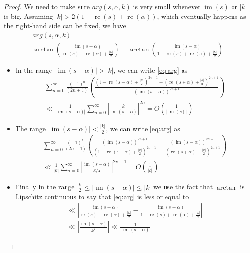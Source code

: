 \documentclass[a4paper,11pt]{amsart}
\theoremstyle{definition}
\newcommand{\imag}{\operatorname{im}}
\newcommand{\real}{\operatorname{re}}
\begin{document}
\begin{proof}
    We need to make sure $arg(s,\alpha,k)$ is very small whenever $\imag(s)$ or $\vert{k}\vert$ is big. Assuming $\vert{k}\vert > 2(1-\real(s)+\real(\alpha))$, which eventually happens as the right-hand side can be fixed, we have \begin{align}\label{eq:arg}&arg(s,\alpha,k) =\nonumber\\& \arctan\left(\frac{\imag(s-\alpha)}{\real(s)+\real(\alpha)+\frac{\vert{k}\vert}{2}}\right)-\arctan\left(\frac{\imag(s-\alpha)}{1-\real(s)+\real(\alpha)+\frac{\vert{k}\vert}{2}}\right).\end{align}
    \begin{itemize}
        \item In the range $\vert{\imag(s-\alpha)}\vert> \vert{k}\vert$,  we can write \eqref{eq:arg} as 
        \begin{align*}&\sum_{n=0}^{\infty}\frac{(-1)^n}{(2n+1)}\left(\frac{(1-\real(s-\alpha)+\frac{\vert{k}\vert}{2})^{2n+1}-(\real(s+\alpha)+\frac{\vert{k}\vert}{2})^{2n+1}}{(\imag(s-\alpha))^{2n+1}}\right) \\ 
        &\ll \frac{1}{\vert{\imag(s-\alpha)}\vert}\sum_{n=0}^{\infty}\left\vert{\frac{k}{\imag(s-\alpha)}}\right\vert^{2n} = O(\frac{1}{\vert{\imag(s)}\vert}) \end{align*}
        \item The range $\vert{\imag(s-\alpha)}\vert<\frac{\vert{k}\vert}{2}$, we can write \eqref{eq:arg} as 
        \begin{align*}
            &\sum_{n=0}^{\infty}\frac{(-1)^n}{(2n+1)}\left(\frac{(\imag(s-\alpha))^{2n+1}}{(1-\real(s-\alpha)+\frac{\vert{k}\vert}{2})^{2n+1}}-\frac{(\imag(s-\alpha))^{2n+1}}{(\real(s+\alpha)+\frac{\vert{k}\vert}{2})^{2n+1}}\right)\\
            &\ll \frac{1}{\vert{k}\vert}\sum_{n=0}^{\infty}\left\vert{\frac{\imag(s-\alpha)}{k/2}}\right\vert^{2n+1} = O(\frac{1}{\vert{k}\vert}) 
        \end{align*}
        \item Finally in the range $\frac{\vert{k}\vert}{2}\leq \vert{\imag(s-\alpha)}\vert\leq \vert{k}\vert$ we use the fact that $\arctan$ is Lipschitz continuous to say that \eqref{eq:arg} is less or equal to
        \begin{align*}
            &\ll\left\vert{\frac{\imag(s-\alpha)}{\real(s)+\real(\alpha)+\frac{\vert{k}\vert}{2}}-\frac{\imag(s-\alpha)}{1-\real(s)+\real(\alpha)+\frac{\vert{k}\vert}{2}}}\right\vert
            \\& \ll \left\vert{\frac{\imag(s-\alpha)}{k^2}}\right\vert \ll \frac{1}{\vert{\imag(s-\alpha)}\vert}

\end{align*}
\end{itemize}
\end{proof}
\end{document}
